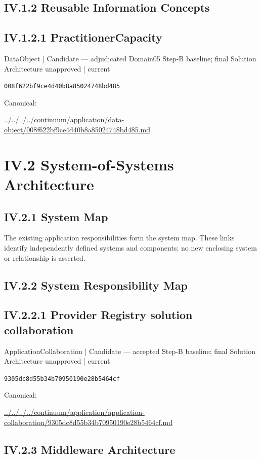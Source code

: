 \documentclass[10pt,a4paper]{article}
\begin{document}
\subsection*{IV.1.2 Reusable Information Concepts}
\subsection*{IV.1.2.1 PractitionerCapacity}
\label{element-008f622bf9ce4d40b8a85024748bd485}
{\small DataObject | Candidate — adjudicated Domain05 Step-B baseline; final Solution Architecture unapproved | current}\par
\texttt{008f622bf9ce4d40b8a85024748bd485}\par
Canonical: \par
{\footnotesize\url{../../../../continuum/application/data-object/008f622bf9ce4d40b8a85024748bd485.md}}\par
\section*{IV.2 System-of-Systems Architecture}
\subsection*{IV.2.1 System Map}
The existing application responsibilities form the system map. These links identify independently defined systems and components; no new enclosing system or relationship is asserted.\par
\subsection*{IV.2.2 System Responsibility Map}
\subsection*{IV.2.2.1 Provider Registry solution collaboration}
\label{element-9305dc8d55b34b70950190e28b5464cf}
{\small ApplicationCollaboration | Candidate — accepted Step-B baseline; final Solution Architecture unapproved | current}\par
\texttt{9305dc8d55b34b70950190e28b5464cf}\par
Canonical: \par
{\footnotesize\url{../../../../continuum/application/application-collaboration/9305dc8d55b34b70950190e28b5464cf.md}}\par
\subsection*{IV.2.3 Middleware Architecture}
\end{document}
